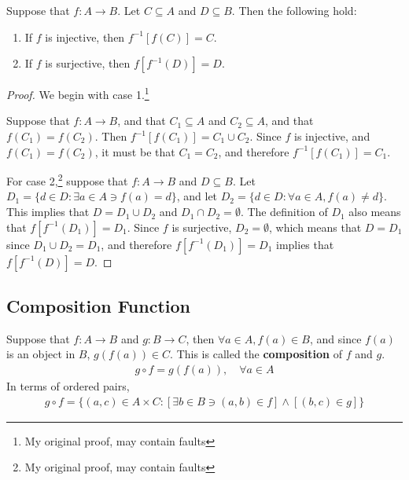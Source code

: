 \begin{theorem}
	\label{theolabel1}
	Suppose that $f:A\rightarrow B$. Let $C\subseteq A$ and $D\subseteq B$. Then the following hold:
	\begin{enumerate}
		\item If $f$ is injective, then $f^{-1}[f(C)]=C$.
		\item If $f$ is surjective, then $f[f^{-1}(D)]=D$.
	\end{enumerate}
\end{theorem}

\begin{proof}
	We begin with case 1.\footnote{My original proof, may contain faults}
	
 	Suppose that $f:A\rightarrow B$, and that $C_1\subseteq A$ and $C_2\subseteq A$, and that $f(C_1)=f(C_2)$. Then $f^{-1}[f(C_1)]=C_1\cup C_2$. Since $f$ is injective, and $f(C_1)=f(C_2)$, it must be that $C_1 = C_2$, and therefore $f^{-1}[f(C_1)]=C_1$.\bigskip
 	
 	For case 2,\footnote{My original proof, may contain faults} suppose that $f:A\rightarrow B$ and $D\subseteq B$. Let $D_1 = \{d\in D: \exists a\in A \ni f(a)=d\}$, and let $D_2 = \{d\in D: \forall a\in A,f(a)\neq d\}$. This implies that $D = D_1 \cup D_2$ and $D_1 \cap D_2 = \emptyset$. The definition of $D_1$ also means that $f[f^{-1}(D_1)] = D_1$. Since $f$ is surjective, $D_2=\emptyset$, which means that $D = D_1$ since $D_1 \cup D_2 = D_1$, and therefore $f[f^{-1}(D_1)] = D_1$ implies that $f[f^{-1}(D)] = D$.
\end{proof}

\newpage
\subsection{Composition Function}
\begin{definition}
	Suppose that $f:A\rightarrow B$ and $g:B\rightarrow C$, then $\forall a\in A, f(a)\in B$, and since $f(a)$ is an object in $B$, $g(f(a))\in C$. This is called the \textbf{composition} of $f$ and $g$.
	\begin{align*}
		g \circ f = g(f(a)), \quad \forall a\in A
	\end{align*}
	In terms of ordered pairs,
	\begin{align*}
		g \circ f = \{(a,c)\in A\times C:[\exists b\in B\ni (a,b)\in f]\land [(b,c)\in g]\}
	\end{align*}
\end{definition}

